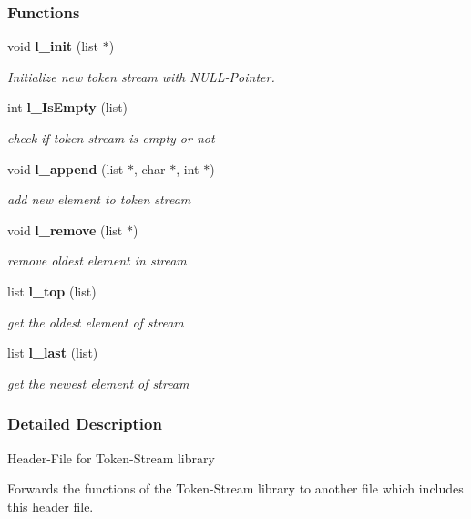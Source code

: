 \subsubsection*{\-Functions}
\begin{DoxyCompactItemize}
\item 
void {\bf l\-\_\-init} (list $\ast$)
\begin{DoxyCompactList}\small\item\em \-Initialize new token stream with \-N\-U\-L\-L-\/\-Pointer. \end{DoxyCompactList}\item 
int {\bf l\-\_\-\-Is\-Empty} (list)
\begin{DoxyCompactList}\small\item\em check if token stream is empty or not \end{DoxyCompactList}\item 
void {\bf l\-\_\-append} (list $\ast$, char $\ast$, int $\ast$)
\begin{DoxyCompactList}\small\item\em add new element to token stream \end{DoxyCompactList}\item 
void {\bf l\-\_\-remove} (list $\ast$)
\begin{DoxyCompactList}\small\item\em remove oldest element in stream \end{DoxyCompactList}\item 
list {\bf l\-\_\-top} (list)
\begin{DoxyCompactList}\small\item\em get the oldest element of stream \end{DoxyCompactList}\item 
list {\bf l\-\_\-last} (list)
\begin{DoxyCompactList}\small\item\em get the newest element of stream \end{DoxyCompactList}\end{DoxyCompactItemize}


\subsubsection{\-Detailed \-Description}
\-Header-\/\-File for \-Token-\/\-Stream library

\-Forwards the functions of the \-Token-\/\-Stream library to another file which includes this header file. 

